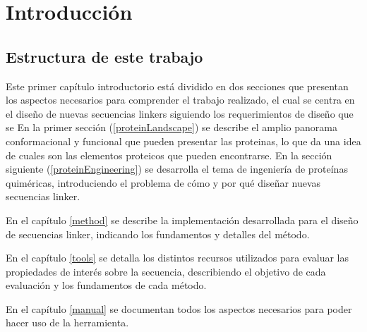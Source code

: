 \chapter{Introducci\'on}



\section{Estructura de este trabajo}

Este primer capítulo introductorio está dividido en dos secciones que presentan los aspectos necesarios para comprender el trabajo realizado, el cual se centra en el diseño de nuevas secuencias linkers 
siguiendo los requerimientos de diseño que se 
En la primer sección (\ref{proteinLandscape}) se describe el amplio panorama conformacional y funcional que pueden presentar las proteinas, lo que da una idea de cuales son las elementos proteicos que pueden encontrarse.
En la sección siguiente (\ref{proteinEngineering}) se desarrolla el tema de ingeniería de proteínas quiméricas, introduciendo el problema de cómo y por qué diseñar nuevas secuencias linker.

En el capítulo \ref{method} se describe la implementación desarrollada para el diseño de secuencias linker, indicando los fundamentos y detalles del método.

En el capítulo \ref{tools} se detalla los distintos recursos utilizados para evaluar las propiedades de interés sobre la secuencia, describiendo el objetivo de cada evaluación y los fundamentos de cada método. 

En el capítulo \ref{manual} se documentan todos los aspectos necesarios para poder hacer uso de la herramienta.

